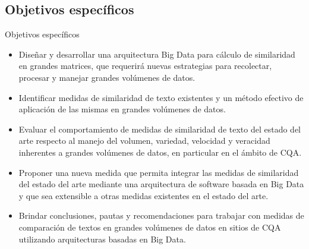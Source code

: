 \subsection{Objetivos específicos}
\begin{frame}{Objetivos específicos}
	\begin{tcolorbox}[colback=blue!5,colframe=blue!40!black,title=Objetivos específicos]
		\begin{scriptsize}
			\begin{itemize} [<+>]
				\item Diseñar y desarrollar una arquitectura Big Data para cálculo de similaridad en grandes matrices, que requerirá nuevas estrategias para recolectar, procesar y manejar grandes volúmenes de datos.
				\item Identificar medidas de similaridad de texto existentes y un método efectivo de aplicación de las mismas en grandes volúmenes de datos.
				\item Evaluar el comportamiento de medidas de similaridad de texto del estado del arte respecto al manejo del volumen, variedad, velocidad y veracidad inherentes a grandes volúmenes de datos, en particular en el ámbito de CQA.
				\item Proponer una nueva medida que permita integrar las medidas de similaridad del estado del arte mediante una arquitectura de software basada en Big Data y que sea extensible a otras medidas existentes en el estado del arte.
				\item Brindar conclusiones, pautas y recomendaciones para trabajar con medidas de comparación de textos en grandes volúmenes de datos en sitios de CQA utilizando arquitecturas basadas en Big Data.
			\end{itemize}
		\end{scriptsize}
	\end{tcolorbox}
\end{frame}